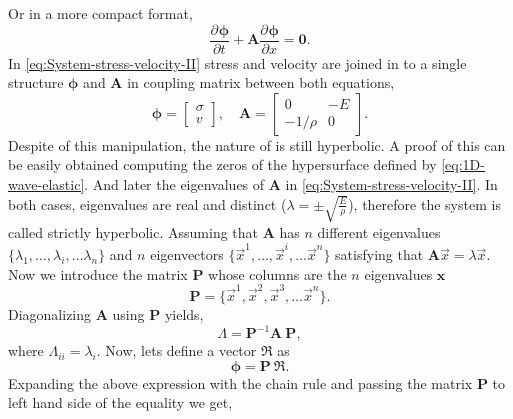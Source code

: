 \documentclass[preprint,12pt,a4paper]{elsarticle}
\newcommand{\tens}[1]{
  \ensuremath{\mathbf{{#1}}}
}
\newcommand{\Matrix}[1]{
  \ensuremath{\mathbf{{#1}}}
}
\newcommand{\Vector}[1]{
  \ensuremath{\mathbf{{#1}}}
}
\newcommand{\Deriv}[3][]{
  \ensuremath{\frac{\partial^{#1}{#2}}{ \partial {#3}^{#1} }}
}
\begin{document}
Or in a more compact format,
\begin{equation}
  \label{eq:System-stress-velocity-II}
  \Deriv{\Vector{\phi}}{t} + \Matrix{A}\Deriv{\Vector{\phi}}{x} = \Vector{0}.
\end{equation}
In \eqref{eq:System-stress-velocity-II} stress and velocity are joined in to a single structure $\Vector{\phi}$ and $\Matrix{A}$ in coupling matrix between both equations,
\begin{equation*}
  \Vector{\phi} = \left[
    \begin{array}{c}
      \sigma \\
      v
    \end{array}
  \right],\quad 
  \Matrix{A} =  \left[
    \begin{array}{cc}
      0 & - E\\
      - 1/\rho & 0 
    \end{array} \right].
\end{equation*}
Despite of this manipulation, the nature
of \label{eq:eq:System-stress-velocity-II} is still hyperbolic. A
proof of this can be easily obtained computing the zeros of the
hypersurface defined by \eqref{eq:1D-wave-elastic}. And later the
eigenvalues of $\Matrix{A}$ in \eqref{eq:System-stress-velocity-II}. In both cases, eigenvalues are real and distinct ($\lambda = \pm \sqrt{\frac{E}{\rho}}$),
therefore the system is called strictly hyperbolic. Assuming that  $\Matrix{A}$ has $n$ different eigenvalues $\{ \lambda_1, \ldots, \lambda_i, \ldots
\lambda_n \}$ and $n$ eigenvectors $\{ \vec{x}^1, \ldots,
\vec{x}^i, \ldots \vec{x}^n \}$ satisfying that $\tens{A} \vec{x} =
\lambda \vec{x} $. Now we introduce the matrix $\Matrix{P}$ whose columns are the $n$ eigenvalues $\Vector{x}$
\begin{equation}
  \label{eq:P-matrix}
\Matrix{P} = \{ \vec{x}^1, \vec{x}^2, \vec{x}^3, \ldots \vec{x}^n \}.
\end{equation}
Diagonalizing $\Matrix{A}$ using $\Matrix{P}$ yields,
\begin{equation}
  \label{eq:Lambda-matrix}
  \Lambda = \Matrix{P}^{-1} \Matrix{A}\ \Matrix{P},
\end{equation}
where $ \Lambda_{ii} = \lambda_i$. Now, lets define a vector $\Vector{\Re}$ as
\begin{equation}
  \label{eq:Riemann-definition}
  \Vector{\phi} = \Matrix{P}\ \Vector{\Re}.
\end{equation}
Expanding the above expression with the chain rule and passing the
matrix $\Matrix{P}$ to left hand side of the equality we get,
\end{document}
